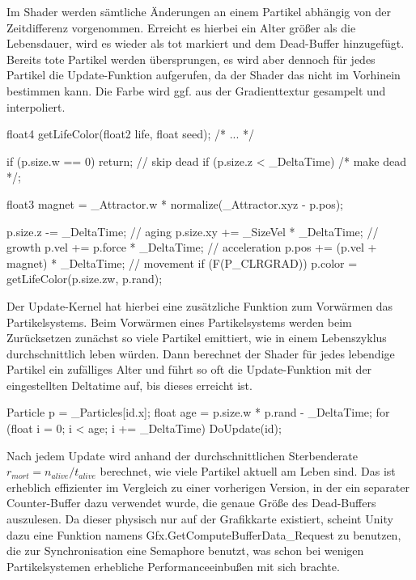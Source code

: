 Im Shader werden sämtliche Änderungen an einem Partikel abhängig von der Zeitdifferenz vorgenommen. Erreicht es hierbei ein Alter grö{\ss}er als die Lebensdauer, wird es wieder als tot markiert und dem Dead-Buffer hinzugefügt. Bereits tote Partikel werden übersprungen, es wird aber dennoch für jedes Partikel die Update-Funktion aufgerufen, da der Shader das nicht im Vorhinein bestimmen kann. Die Farbe wird ggf. aus der Gradienttextur gesampelt und interpoliert.

\begin{hlsl}[caption=Compute Update]
float4 getLifeColor(float2 life, float seed);
/* ... */

if (p.size.w == 0) return; // skip dead
if (p.size.z < _DeltaTime) /* make dead */;

float3 magnet = _Attractor.w * normalize(_Attractor.xyz - p.pos);

p.size.z -= _DeltaTime;             // aging
p.size.xy += _SizeVel * _DeltaTime; // growth
p.vel += p.force * _DeltaTime;      // acceleration
p.pos += (p.vel + magnet) * _DeltaTime; // movement
if (F(P_CLRGRAD)) p.color = getLifeColor(p.size.zw, p.rand);
\end{hlsl}

Der Update-Kernel hat hierbei eine zusätzliche Funktion zum Vorwärmen das Partikelsystems. Beim Vorwärmen eines Partikelsystems werden beim Zurücksetzen zunächst so viele Partikel emittiert, wie in einem Lebenszyklus durchschnittlich leben würden. Dann berechnet der Shader für jedes lebendige Partikel ein zufälliges Alter und führt so oft die Update-Funktion mit der eingestellten Deltatime auf, bis dieses erreicht ist.

\begin{hlsl}[caption=Compute Prewarm Update Kernel]
Particle p = _Particles[id.x];
float age = p.size.w * p.rand - _DeltaTime;
for (float i = 0; i < age; i += _DeltaTime) DoUpdate(id);
\end{hlsl}

Nach jedem Update wird anhand der durchschnittlichen Sterbenderate $r_{mort} = n_{alive} / t_{alive}$ berechnet, wie viele Partikel aktuell am Leben sind. Das ist erheblich effizienter im Vergleich zu einer vorherigen Version, in der ein separater Counter-Buffer dazu verwendet wurde, die genaue Grö{\ss}e des Dead-Buffers auszulesen. Da dieser physisch nur auf der Grafikkarte existiert, scheint Unity dazu eine Funktion namens Gfx.GetComputeBufferData\_Request zu benutzen, die zur Synchronisation eine Semaphore benutzt, was schon bei wenigen Partikelsystemen erhebliche Performanceeinbu{\ss}en mit sich brachte.

